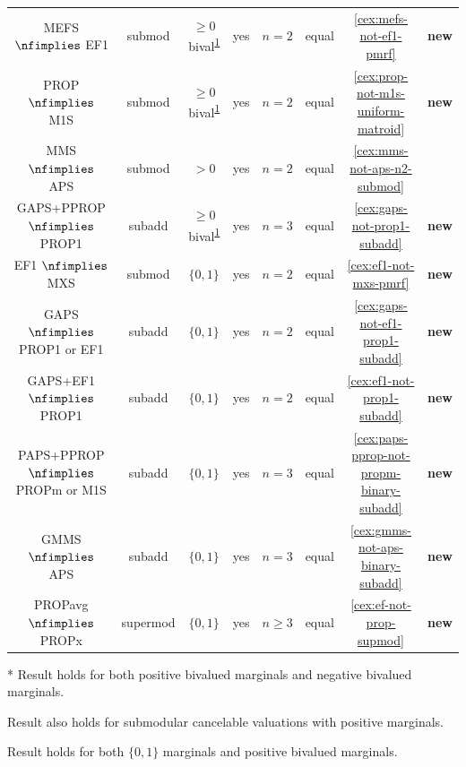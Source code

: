 \begin{table}[!htb]
\begin{tabular}{cccccccc}
\\[\defaultaddspace] MEFS $\nfimplies$ EF1
    & submod & $\ge 0$ bival\textsuperscript{\ref{foot:nonneg-bival}}
    & yes & $n=2$ & equal & \cref{cex:mefs-not-ef1-pmrf} & \textbf{new}
\\[\defaultaddspace] PROP $\nfimplies$ M1S
    & submod & $\ge 0$ bival\textsuperscript{\ref{foot:nonneg-bival}}
    & yes & $n=2$ & equal & \cref{cex:prop-not-m1s-uniform-matroid} & \textbf{new}
\\[\defaultaddspace] MMS $\nfimplies$ APS
    & submod & $> 0$ & yes & $n=2$ & equal & \cref{cex:mms-not-aps-n2-submod} & \cite{babaioff2023fair}
\\[\defaultaddspace] GAPS+PPROP $\nfimplies$ PROP1
    & subadd & $\ge 0$ bival\textsuperscript{\ref{foot:nonneg-bival}}
    & yes & $n=3$ & equal & \cref{cex:gaps-not-prop1-subadd} & \textbf{new}
%
\\\midrule EF1 $\nfimplies$ MXS
    & submod & $\{0, 1\}$ & yes & $n=2$ & equal & \cref{cex:ef1-not-mxs-pmrf} & \textbf{new}
\\[\defaultaddspace] GAPS $\nfimplies$ PROP1 or EF1
    & subadd & $\{0, 1\}$ & yes & $n=2$ & equal & \cref{cex:gaps-not-ef1-prop1-subadd} & \textbf{new}
\\[\defaultaddspace] GAPS+EF1 $\nfimplies$ PROP1
    & subadd & $\{0, 1\}$ & yes & $n=2$ & equal & \cref{cex:ef1-not-prop1-subadd} & \textbf{new}
\\[\defaultaddspace] \hfill\makecell[l]{PAPS+PPROP \\ $\nfimplies$ PROPm or M1S}\hfill
    & subadd & $\{0, 1\}$ & yes & $n=3$ & equal & \cref{cex:paps-pprop-not-propm-binary-subadd} & \textbf{new}
\\[\defaultaddspace] GMMS $\nfimplies$ APS
    & subadd & $\{0, 1\}$ & yes & $n=3$ & equal & \cref{cex:gmms-not-aps-binary-subadd} & \textbf{new}
\\[\defaultaddspace] PROPavg $\nfimplies$ PROPx
    & supermod & $\{0, 1\}$ & yes & $n \ge 3$ & equal & \cref{cex:ef-not-prop-supmod} & \textbf{new}
\\ \bottomrule
\end{tabular}

\begin{tightenum}
\item[*] \label{foot:pos-neg-bival}Result holds for both
    positive bivalued marginals and negative bivalued marginals.
\item[\textdagger] \label{foot:unit-dem}Result also holds for
    submodular cancelable valuations with positive marginals.
\item[\textdaggerdbl] \label{foot:nonneg-bival}Result holds for both
    $\{0, 1\}$ marginals and positive bivalued marginals.
\end{tightenum}
\end{table}
